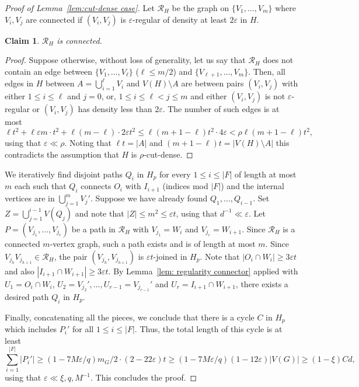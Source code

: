 \documentclass[10pt]{article}
\newtheorem{claim}[theorem]{Claim}
\theoremstyle{definition}
\let\leq\leqslant
\let\geq\geqslant
\begin{document}
\begin{proof}[Proof of Lemma~\ref{lem:cut-dense case}]
Let $\mathcal R_H$ be the graph on $\{V_1,\ldots, V_m\}$ where $V_i,V_j$ are connected if $(V_i,V_j)$ is $\varepsilon$-regular of density at least $2\varepsilon$ in $H$.
    \begin{claim}\label{claim: cluster graph is connected}
        $\mathcal R_H$ is connected.
    \end{claim}
    \begin{proof}
        Suppose otherwise, without loss of generality, let us say that $\mathcal R_H$ does not contain an edge between $\{V_1,\ldots, V_\ell\}$ ($\ell\leq m/2$) and $\{V_{\ell+1},\ldots,V_m\}$. Then, all edges in $H$ between $A=\bigcup_{i=1}^\ell V_i$ and $V(H)\setminus A$ are between pairs $(V_i,V_j)$ with either $1\leq i\leq\ell$ and $j=0$, or, $1\leq i\leq\ell<j\leq m$ and either $(V_i,V_j)$ is not $\varepsilon$-regular or $(V_i,V_j)$ has density less than $2\varepsilon$. The number of such edges is at most
        $$
        \ell t^2+\ell\varepsilon m\cdot t^2+\ell(m-\ell)\cdot2\varepsilon t^2\leq \ell(m+1-\ell)t^2\cdot 4\varepsilon< \rho\ell(m+1-\ell)t^2,
        $$
        using that $\varepsilon \ll \rho$.
        Noting that $\ell t=|A|$ and $(m+1-\ell)t=|V(H)\setminus A|$ this contradicts the assumption that $H$ is $\rho$-cut-dense.
    \end{proof}
    We iteratively find disjoint paths $Q_i$ in $H_p$ for every $1\leq i\leq |F|$ of length at most $m$ each such that $Q_i$ connects $O_i$ with $I_{i+1}$ (indices mod $|F|$) and the internal vertices are in $\bigcup_{j=1}^m V_{j}'$. Suppose we have already found $Q_1,\ldots, Q_{i-1}$. Set $Z=\bigcup_{j=1}^{i-1}V(Q_{j})$ and note that $|Z|\leq m^2\leq \varepsilon t$, using that $d^{-1}\ll \varepsilon$. Let $P=(V_{j_1},\ldots, V_{j_r})$ be a path in $\mathcal R_H$ with $V_{j_1}=W_i$ and $V_{j_r}=W_{i+1}$. Since $\mathcal R_H$ is a connected $m$-vertex graph, such a path exists and is of length at most $m$. Since $V_{j_h}V_{j_{h+1}}\in \mathcal R_H$, the pair $(V_{j_h},V_{j_{h+1}})$ is $\varepsilon t$-joined in $H_p$. Note that $|O_i\cap W_i|\geq 3\varepsilon t$ and also $|I_{i+1}\cap W_{i+1}|\geq 3\varepsilon t$. By Lemma~\ref{lem: regularity connector} applied with $U_1=O_i\cap W_i$, $U_2 = V_{j_2}',\ldots, U_{r-1}=V_{j_{r-1}}'$ and $U_r=I_{i+1}\cap W_{i+1}$, there exists a desired path $Q_i$ in $H_p$. 

    Finally, concatenating all the pieces, we conclude that there is a cycle $C$ in $H_p$ which includes $P_i'$ for all $1\leq i\leq |F|$.
    Thus, the total length of this cycle is at least 
    $$\sum_{i=1}^{|F|}|P_i'|\geq (1-7M\varepsilon/q)m_G/2\cdot (2-22\varepsilon)t\geq (1-7M\varepsilon/q)(1-12\varepsilon)|V(G)|\geq (1-\xi)Cd,$$
    using that $\varepsilon \ll \xi,q,M^{-1}$. This concludes the proof.
\end{proof}
\end{document}
